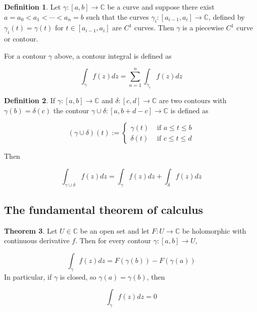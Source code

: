 \documentclass[12pt,a4paper]{article}
\theoremstyle{definition}
\newtheorem{definition}{Definition}[subsection]
\newtheorem{theorem}[definition]{Theorem}
\begin{document}
\begin{definition}
	Let $\gamma: [a, b] \rightarrow \mathbb{C}$ be a curve and suppose there exist $a = a_0 < a_1 < \cdots < a_n = b$ such that the curves $\gamma_i: [a_{i - 1}, a_i] \rightarrow \mathbb{C}$, defined by $\gamma_i(t) = \gamma(t)$ for $t \in [a_{i - 1}, a_i]$ are $C^1$ curves. Then $\gamma$ is a piecewise $C^1$ curve or contour.

	For a contour $\gamma$ above, a contour integral is defined as

	\[ \int_{\gamma} f(z) dz = \sum_{n = 1}^n \int_{\gamma_i} f(z) dz \]
\end{definition}

\begin{definition}
	If $\gamma: [a, b] \rightarrow \mathbb{C}$ and $\delta: [c, d] \rightarrow \mathbb{C}$ are two contours with $\gamma(b) = \delta(c)$ the contour $\gamma \cup \delta: [a, b + d - c] \rightarrow \mathbb{C}$ is defined as

	\[ (\gamma \cup \delta)(t) := \begin{cases}
		\gamma(t) & \text{ if } a \le t \le b \\
		\delta(t) & \text{ if } c \le t \le d
	\end{cases} \]

	Then

	\[ \int_{\gamma \cup \delta} f(z) dz = \int_{\gamma} f(z) dz + \int_{\delta} f(z) dz \]
\end{definition}

\subsection{The fundamental theorem of calculus}

\begin{theorem}
	Let $U \in \mathbb{C}$ be an open set and let $F: U \rightarrow \mathbb{C}$ be holomorphic with continuous derivative $f$. Then for every contour $\gamma: [a, b] \rightarrow U$,

	\[ \int_{\gamma} f(z) dz = F(\gamma(b)) - F(\gamma(a)) \]
	In particular, if $\gamma$ is closed, so $\gamma(a) = \gamma(b)$, then

	\[ \int_{\gamma} f(z) dz = 0 \]
\end{theorem}
\end{document}
